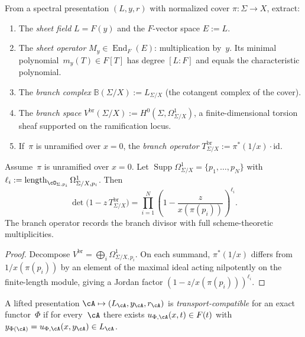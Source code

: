 \begin{construction}
\label{cons:lifted-spectral-package}
From a spectral presentation $(L, y, r)$ with normalized cover
$\pi \colon \Sigma \to X$, extract:
\begin{enumerate}[label=\textup{(\roman*)}]
\item The \emph{sheet field} $L = F(y)$ and the $F$-vector
  space $E := L$.
\item The \emph{sheet operator}
  $M_y \in \operatorname{End}_F(E)$: multiplication by~$y$.
  Its minimal polynomial~$m_y(T) \in F[T]$ has degree
  $[L:F]$ and equals the characteristic polynomial.
\item The \emph{branch complex}
  $\mathbb{B}(\Sigma/X) := L_{\Sigma/X}$
  (the cotangent complex of the cover).
\item The \emph{branch space}
  $V^{\mathrm{br}}(\Sigma/X)
  := H^0(\Sigma, \Omega^1_{\Sigma/X})$,
  a finite-dimensional torsion sheaf supported on the
  ramification locus.
\item If~$\pi$ is unramified over $x = 0$, the
  \emph{branch operator}
  $T^{\mathrm{br}}_{\Sigma/X}
  := \pi^*(1/x) \cdot \mathrm{id}$.
\end{enumerate}
\end{construction}

\begin{theorem}
\label{thm:determinantal-branch-formula}
Assume~$\pi$ is unramified over $x = 0$.  Let
$\operatorname{Supp}\Omega^1_{\Sigma/X}
= \{p_1, \ldots, p_N\}$ with
$\ell_i :=
\operatorname{length}_{\cO_{\Sigma,p_i}}
\Omega^1_{\Sigma/X,p_i}$.  Then
\[
\det\bigl(1 - z\, T^{\mathrm{br}}_{\Sigma/X}\bigr)
= \prod_{i=1}^{N}
  \left(1 - \frac{z}{x(\pi(p_i))}\right)^{\ell_i}.
\]
The branch operator records the branch divisor with full
scheme-theoretic multiplicities.
\end{theorem}

\begin{proof}
Decompose $V^{\mathrm{br}} = \bigoplus_i \Omega^1_{\Sigma/X,p_i}$.
On each summand, $\pi^*(1/x)$ differs from
$1/x(\pi(p_i))$ by an element of the maximal ideal acting
nilpotently on the finite-length module, giving a Jordan factor
$(1 - z/x(\pi(p_i)))^{\ell_i}$.
\end{proof}

\begin{definition}
\label{def:transport-compatible-presentation}
A lifted presentation
$\cA \mapsto (L_\cA, y_\cA, r_\cA)$ is
\emph{transport-compatible} for an exact functor~$\Phi$ if for
every~$\cA$ there exists $u_{\Phi,\cA}(x,t) \in F(t)$ with
$y_{\Phi(\cA)} = u_{\Phi,\cA}(x, y_\cA) \in L_\cA$.
\end{definition}


